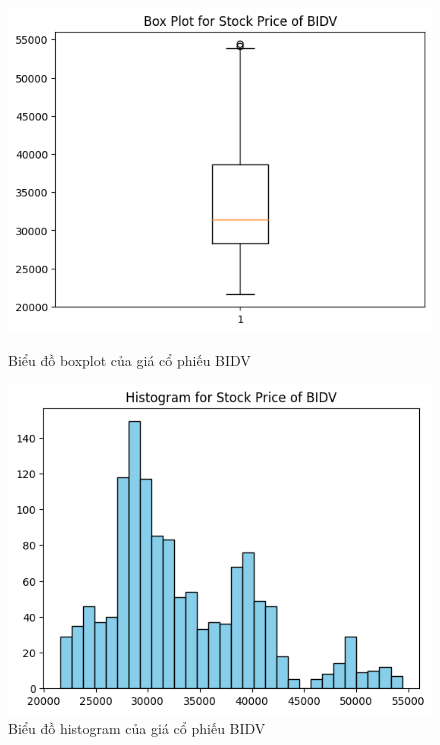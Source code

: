 \begin{figure}[H]
    \centering
    \begin{minipage}{0.23\textwidth}
    \centering
    \includegraphics[width=1\textwidth]{resources/chapter-3/newdata/Boxplot_BIDV.png}
    \caption{Biểu đồ boxplot của giá cổ phiếu BIDV}
    \label{fig:bidv_boxplot}
    \end{minipage}
    \hfill
    \begin{minipage}{0.23\textwidth}
    \centering
    \includegraphics[width=1\textwidth]{resources/chapter-3/newdata/Histogram_BIDV.png}
    \caption{Biểu đồ histogram của giá cổ phiếu BIDV}
    \label{fig:bidv_histogram}
    \end{minipage}
\end{figure}

